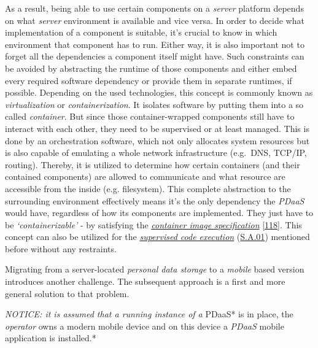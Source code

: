 \documentclass[12pt,english,a4paper,titlepage,cleardoublepage=empty,dottedtoc]{report}
\begin{document}
As a result, being able to use certain components on a \emph{server}
platform depends on what \emph{server} environment is available and vice
versa. In order to decide what implementation of a component is
suitable, it's crucial to know in which environment that component has
to run. Either way, it is also important not to forget all the
dependencies a component itself might have. Such constraints can be
avoided by abstracting the runtime of those components and either embed
every required software dependency or provide them in separate runtimes,
if possible. Depending on the used technologies, this concept is
commonly known as \emph{virtualization} or \emph{containerization}. It
isolates software by putting them into a so called \emph{container}. But
since those container-wrapped components still have to interact with
each other, they need to be supervised or at least managed. This is done
by an orchestration software, which not only allocates system resources
but is also capable of emulating a whole network infrastructure
(e.g.~DNS, TCP/IP, routing). Thereby, it is utilized to determine how
certain containers (and their contained components) are allowed to
communicate and what resource are accessible from the inside (e.g.
filesystem). This complete abstraction to the surrounding environment
effectively means it's the only dependency the \emph{PDaaS} would have,
regardless of how its components are implemented. They just have to be
\emph{`containerizable'} - by satisfying the
\emph{\protect\hyperlink{def--container}{container image specification}}
{[}\protect\hyperlink{ref-web_oci-spec_image}{118}{]}. This concept can
also be utilized for the
\emph{\protect\hyperlink{supervised-data-access}{supervised code
execution}} (\protect\hyperlink{sa01}{S.A.01}) mentioned before without
any restraints.

Migrating from a server-located \emph{personal data storage} to a
\emph{mobile} based version introduces another challenge. The subsequent
approach is a first and more general solution to that problem.

\emph{NOTICE: it is assumed that a running instance of a }PDaaS* is in
place, the \emph{operator} owns a modern mobile device and on this
device a \emph{PDaaS} mobile application is installed.*
\end{document}
